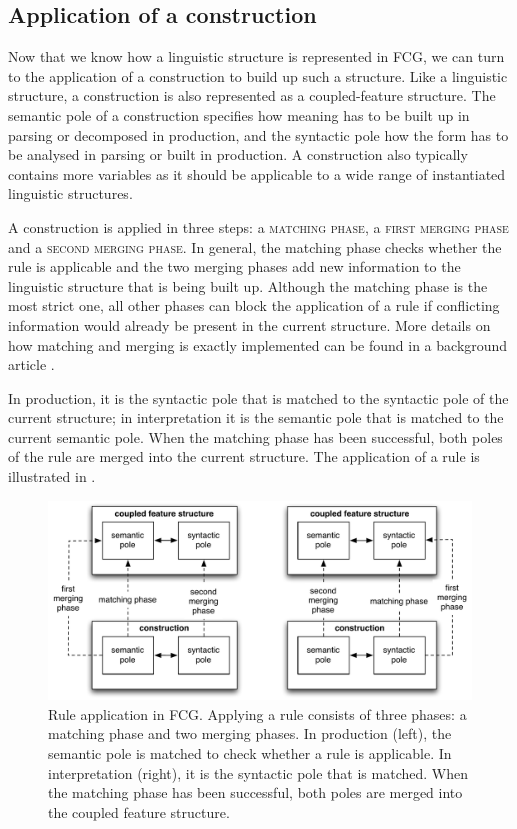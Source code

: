 \subsection{Application of a construction}
\largerpage
Now that we know how a linguistic structure is represented in FCG, we
can turn to the application of a construction to build up such a
structure. Like a linguistic structure, a construction is also
represented as a coupled-feature structure. The semantic pole of a
construction specifies how meaning has to be built up in parsing or
decomposed in production, and the syntactic pole how the form has to
be analysed in parsing or built in production. A construction also
typically contains more variables as it should be applicable to a wide
range of instantiated linguistic structures.

A construction is applied in three steps: a \textsc{matching phase}, a
\textsc{first merging phase} and a \textsc{second merging phase}. In
general, the matching phase checks whether the rule is applicable and
the two merging phases add new information to the linguistic structure
that is being built up. Although the matching phase is the most strict
one, all other phases can block the application of a rule if
conflicting information would already be present in the current
structure. More details on how matching and merging is exactly
implemented can be found in a background article
\citep{steels06unify}.

In production, it is the syntactic pole that is matched to the
syntactic pole of the current structure; in interpretation it is the
semantic pole that is matched to the current semantic pole. When the
matching phase has been successful, both poles of the rule are merged
into the current structure. The application of a rule is illustrated
in .

\begin{figure}[htb]
  \begin{center}
    \includegraphics[width=\textwidth]{./frameworks/figures/fcg-rule-application.pdf}
    \caption[Application of a rule]{Rule application in FCG. Applying
      a rule consists of three phases: a matching phase and two
      merging phases. In production (left), the semantic pole is
      matched to check whether a rule is applicable. In interpretation
      (right), it is the syntactic pole that is matched. When the
      matching phase has been successful, both poles are merged into
      the coupled feature structure.}
    \label{f:fcg-rule-application}
  \end{center}
\end{figure}

